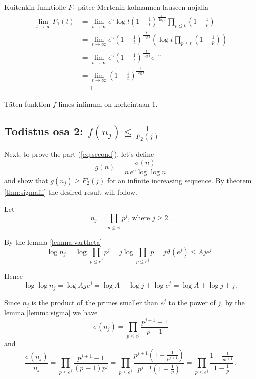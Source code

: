 \documentclass{article}
\theoremstyle{definition}
\begin{document}
Kuitenkin funktiolle $F_1$ pätee Mertenin kolmannen lauseen nojalla
\begin{align*}
    \lim_{t \rightarrow \infty} F_1(t) & = \lim_{t \rightarrow \infty} e^\gamma \log t \left(1-\frac{1}{t}\right)^\frac{t}{\log t} \prod_{p\leq t} \left(1-\frac{1}{p}\right)\\
    & = \lim_{t \rightarrow \infty} e^\gamma \left( 1-\frac{1}{t}\right)^\frac{t}{\log t} \left(\log t \prod_{p\leq t} \left(1-\frac{1}{p}\right) \right)\\
    & = \lim_{t \rightarrow \infty} e^\gamma \left( 1-\frac{1}{t}\right)^\frac{t}{\log t} e^{-\gamma}\\
    & = \lim_{t \rightarrow \infty} \left( 1-\frac{1}{t}\right)^\frac{t}{\log t}\\
    & = 1
\end{align*}

Täten funktion $f$ limes infimum on korkeintaan 1.

\subsection{Todistus osa 2: $f(n_j) \leq \frac{1}{F_2(j)}$}

Next, to prove the part (\ref{eq:second}), let's define
\begin{equation*}
    g(n)=\frac{\sigma(n)}{n\,e^\gamma \log\log n}
\end{equation*}
and show that $g(n_j) \geq F_2(j)$ for an infinite increasing sequence. By theorem \ref{thm:sigmafii} the desired result will follow.

Let
\begin{equation*}
    n_j=\prod_{p\leq e^j} p^j\text{, where } j\geq 2\,.
\end{equation*}

By the lemma \ref{lemma:vartheta}
\begin{equation*}
    \log n_j = \log \prod_{p\leq e^j} p^j = j \log \prod_{p\leq e^j} p = j\vartheta(e^j) \leq Aje^j\,.
\end{equation*}

Hence
\begin{equation}
\label{eq:lognj}
    \log \log n_j = \log Aje^j = \log A + \log j + \log e^j = \log A + \log j + j\,.
\end{equation}

Since $n_j$ is the product of the primes smaller than $e^j$ to the power of $j$, by the lemma \ref{lemma:sigma} we have
\begin{equation*}
    \sigma(n_j) = \prod_{p\leq e^j} \frac{p^{j+1}-1}{p-1}
\end{equation*}
and
\begin{equation}
\label{eq:signjpernj}
    \frac{\sigma(n_j)}{n_j} = \prod_{p\leq e^j} \frac{p^{j+1}-1}{(p-1)p^j} = \prod_{p\leq e^j} \frac{p^{j+1}\left(1-\frac{1}{p^{j+1}}\right)}{p^{j+1}\left(1-\frac{1}{p}\right)} = \prod_{p\leq e^j} \frac{1-\frac{1}{p^{j+1}}}{1-\frac{1}{p}}\,.
\end{equation}
\end{document}
